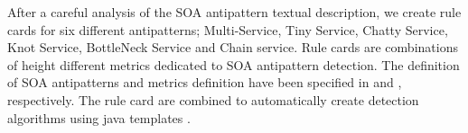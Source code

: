 \documentclass[lnbip]{svmultln}
\begin{document}
After a careful analysis of the SOA antipattern textual description, we create rule cards for six different antipatterns; Multi-Service, Tiny Service, Chatty Service, Knot Service, BottleNeck Service and Chain service. Rule cards are combinations of height different metrics dedicated to SOA antipattern detection. The definition of SOA antipatterns and metrics definition have been specified in \cite{Palma} and \cite{Nayrolles2013a}, respectively. The rule card are combined to automatically create detection algorithms using java templates \cite{Nayrolles}.
%
%
\end{document}
